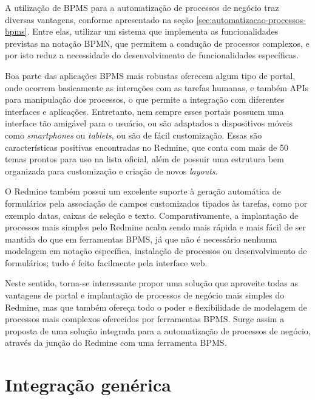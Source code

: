 A utilização de BPMS para a automatização de processos de negócio traz diversas vantagens, conforme apresentado na seção \ref{sec:automatizacao-processos-bpms}. Entre elas, utilizar um sistema que implementa as funcionalidades previstas na notação BPMN, que permitem a condução de processos complexos, e por isto reduz a necessidade do desenvolvimento de funcionalidades específicas. 

Boa parte das aplicações BPMS mais robustas oferecem algum tipo de portal, onde ocorrem basicamente as interações com as tarefas humanas, e também APIs para manipulação dos processos, o que permite a integração com diferentes interfaces e aplicações. Entretanto, nem sempre esses portais possuem uma interface tão amigável para o usuário, ou são adaptados a dispositivos móveis como \textit{smartphones} ou \textit{tablets}, ou são de fácil customização. Essas são características positivas encontradas no Redmine, que conta com mais de 50 temas prontos para uso na lista oficial\cite{redmine_themes}, além de possuir uma estrutura bem organizada para customização e criação de novos \textit{layouts}. 

O Redmine também possui um excelente suporte à geração automática de formulários pela associação de campos customizados tipados às tarefas, como por exemplo datas, caixas de seleção e texto. Comparativamente, a implantação de processos mais simples pelo Redmine acaba sendo mais rápida e mais fácil de ser mantida do que em ferramentas BPMS, já que não é necessário nenhuma modelagem em notação específica, instalação de processos ou desenvolvimento de formulários; tudo é feito facilmente pela interface web. 

Neste sentido, torna-se interessante propor uma solução que aproveite todas as vantagens de portal e implantação de processos de negócio mais simples do Redmine, mas que também ofereça todo o poder e flexibilidade de modelagem de processos mais complexos oferecidos por ferramentas BPMS. Surge assim a proposta de uma solução integrada para a automatização de processos de negócio, através da junção do Redmine com uma ferramenta BPMS.

\section{Integração genérica}\label{sec:cenario-integracao-genérica}

